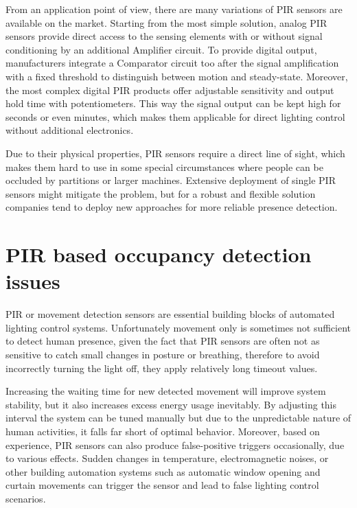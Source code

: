 From an application point of view, there are many variations of PIR sensors are available on the market. Starting from the most simple solution, analog PIR sensors provide direct access to the sensing elements with or without signal conditioning by an additional Amplifier circuit. To provide digital output, manufacturers integrate a Comparator circuit too after the signal amplification with a fixed threshold to distinguish between motion and steady-state. Moreover, the most complex digital PIR products offer adjustable sensitivity and output hold time with potentiometers. This way the signal output can be kept high for seconds or even minutes, which makes them applicable for direct lighting control without additional electronics.


Due to their physical properties, PIR sensors require a direct line of sight, which makes them hard to use in some special circumstances where people can be occluded by partitions or larger machines. Extensive deployment of single PIR sensors might mitigate the problem, but for a robust and flexible solution companies tend to deploy new approaches for more reliable presence detection.





\section{PIR based occupancy detection issues}

PIR or movement detection sensors are essential building blocks of automated lighting control systems. Unfortunately movement only is sometimes not sufficient to detect human presence, given the fact that PIR sensors are often not as sensitive to catch small changes in posture or breathing, therefore to avoid incorrectly turning the light off, they apply relatively long timeout values. 

Increasing the waiting time for new detected movement will improve system stability, but it also increases excess energy usage inevitably. By adjusting this interval the system can be tuned manually but due to the unpredictable nature of human activities, it falls far short of optimal behavior. Moreover, based on experience, PIR sensors can also produce false-positive triggers occasionally, due to various effects. Sudden changes in temperature, electromagnetic noises, or other building automation systems such as automatic window opening and curtain movements can trigger the sensor and lead to false lighting control scenarios. 


